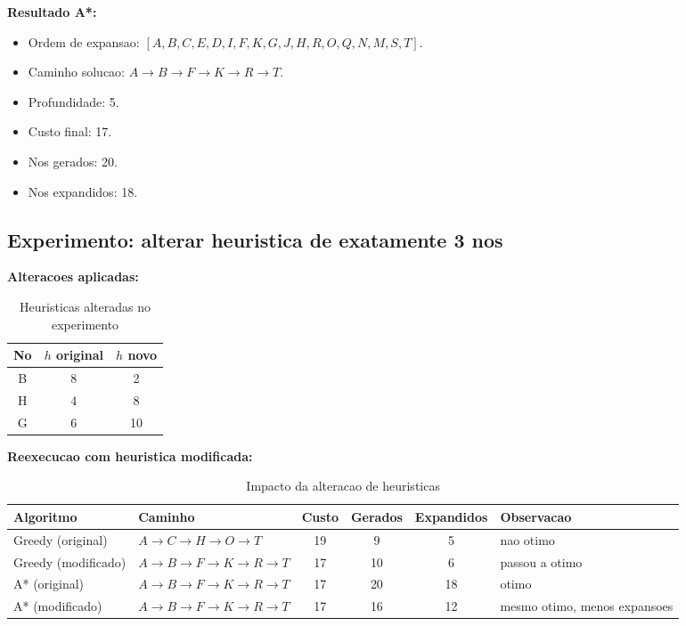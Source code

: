\textbf{Resultado A*:}
\begin{itemize}[leftmargin=1.5em]
  \item Ordem de expansao: $[A,B,C,E,D,I,F,K,G,J,H,R,O,Q,N,M,S,T]$.
  \item Caminho solucao: $A \rightarrow B \rightarrow F \rightarrow K \rightarrow R \rightarrow T$.
  \item Profundidade: 5.
  \item Custo final: 17.
  \item Nos gerados: 20.
  \item Nos expandidos: 18.
\end{itemize}

\subsection{Experimento: alterar heuristica de exatamente 3 nos}
\textbf{Alteracoes aplicadas:}
\begin{table}[H]
\centering
\begin{tabular}{c c c}
\toprule
No & $h$ original & $h$ novo \\
\midrule
B & 8 & 2 \\
H & 4 & 8 \\
G & 6 & 10 \\
\bottomrule
\end{tabular}
\caption{Heuristicas alteradas no experimento}
\end{table}

\textbf{Reexecucao com heuristica modificada:}
\begin{table}[H]
\centering
\scriptsize
\setlength{\tabcolsep}{4.5pt}
\renewcommand{\arraystretch}{1.15}
\begin{tabular}{>{\raggedright\arraybackslash}p{2.4cm} >{\raggedright\arraybackslash}p{4.4cm} c c c >{\raggedright\arraybackslash}p{2.4cm}}
\toprule
Algoritmo & Caminho & Custo & Gerados & Expandidos & Observacao \\
\midrule
Greedy (original) & $A \rightarrow C \rightarrow H \rightarrow O \rightarrow T$ & 19 & 9 & 5 & nao otimo \\
Greedy (modificado) & $A \rightarrow B \rightarrow F \rightarrow K \rightarrow R \rightarrow T$ & 17 & 10 & 6 & passou a otimo \\
\midrule
A* (original) & $A \rightarrow B \rightarrow F \rightarrow K \rightarrow R \rightarrow T$ & 17 & 20 & 18 & otimo \\
A* (modificado) & $A \rightarrow B \rightarrow F \rightarrow K \rightarrow R \rightarrow T$ & 17 & 16 & 12 & mesmo otimo, menos expansoes \\
\bottomrule
\end{tabular}
\caption{Impacto da alteracao de heuristicas}
\end{table}


